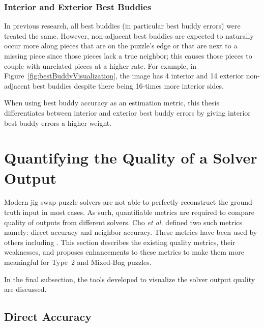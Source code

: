 \documentclass{report}
\begin{document}
\subsubsection{Interior and Exterior Best Buddies}\label{sec:interiorExteriorBestBuddies}

In previous research, all best buddies (in particular best buddy errors) were treated the same.  However, non-adjacent best buddies are expected to naturally occur more along pieces that are on the puzzle's edge or that are next to a missing piece since those pieces lack a true neighbor; this causes those pieces to couple with unrelated pieces at a higher rate.  For example, in Figure~\ref{fig:bestBuddyVisualization}, the image has 4 interior and 14 exterior non-adjacent best buddies despite there being 16-times more interior sides. 

When using best buddy accuracy as an estimation metric, this thesis differentiates between interior and exterior best buddy errors by giving interior best buddy errors a higher weight.







\pagebreak
\section{Quantifying the Quality of a Solver Output}\label{sec:quantifyingSolverQuantify}

Modern jig swap puzzle solvers are not able to perfectly reconstruct the ground-truth input in most cases.  As such, quantifiable metrics are required to compare quality of outputs from different solvers.  Cho \textit{et al.} \cite{cho2010} defined two such metrics namely: direct accuracy and neighbor accuracy. These metrics have been used by others including \cite{sholomon2013, pomeranz2011, paikin2015, son2014, gallagher2012}.  This section describes the existing quality metrics, their weaknesses, and proposes enhancements to these metrics to make them more meaningful for Type~2 and Mixed-Bag puzzles.

In the final subsection, the tools developed to visualize the solver output quality are discussed.

\subsection{Direct Accuracy}\label{sec:directAccuracy}
\end{document}
